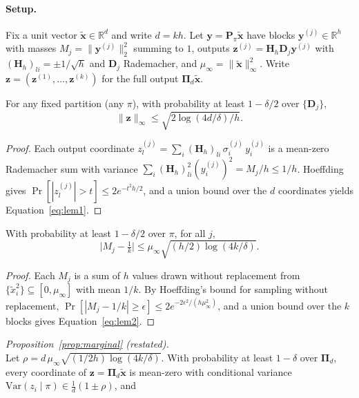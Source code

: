 \paragraph{Setup.}
Fix a unit vector $\tilde{\mathbf{x}} \in \mathbb{R}^d$ and write $d = kh$. Let $\mathbf{y} = \mathbf{P}_\pi \tilde{\mathbf{x}}$ have blocks $\mathbf{y}^{(j)} \in \mathbb{R}^h$ with masses $M_j = \|\mathbf{y}^{(j)}\|_2^2$ summing to $1$, outputs $\mathbf{z}^{(j)} = \mathbf{H}_h \mathbf{D}_j \mathbf{y}^{(j)}$ with $(\mathbf{H}_h)_{li} = \pm 1/\sqrt{h}$ and $\mathbf{D}_j$ Rademacher, and $\mu_\infty = \|\tilde{\mathbf{x}}\|_\infty^2$. Write $\mathbf{z} = (\mathbf{z}^{(1)}, \dots, \mathbf{z}^{(k)})$ for the full output $\boldsymbol{\Pi}_d \tilde{\mathbf{x}}$.
\begin{lemma}
\label{lem:block-incoherence}
For any fixed partition (any $\pi$), with probability at least $1 - \delta/2$ over $\{\mathbf{D}_j\}$,
\begin{equation}
\|\mathbf{z}\|_\infty \le \sqrt{2 \log(4d/\delta)/h}.
\label{eq:lem1}
\end{equation}
\end{lemma}
\begin{proof}
Each output coordinate $z^{(j)}_l = \sum_i (\mathbf{H}_h)_{li}\, \sigma^{(j)}_i\, y^{(j)}_i$ is a mean-zero Rademacher sum with variance $\sum_i (\mathbf{H}_h)_{li}^2 (y^{(j)}_i)^2 = M_j/h \le 1/h$. Hoeffding gives $\Pr[|z^{(j)}_l| > t] \le 2 e^{-t^2 h/2}$, and a union bound over the $d$ coordinates yields Equation~\eqref{eq:lem1}.
\end{proof}
\begin{lemma}
\label{lem:balancing}
With probability at least $1 - \delta/2$ over $\pi$, for all $j$,
\begin{equation}
\big| M_j - \tfrac{1}{k} \big| \le \mu_\infty \sqrt{(h/2)\log(4k/\delta)}.
\label{eq:lem2}
\end{equation}
\end{lemma}
\begin{proof}
Each $M_j$ is a sum of $h$ values drawn without replacement from $\{\tilde{x}_i^2\} \subseteq [0, \mu_\infty]$ with mean $1/k$. By Hoeffding's bound for sampling without replacement, $\Pr[|M_j - 1/k| \ge \epsilon] \le 2 e^{-2\epsilon^2 / (h\mu_\infty^2)}$, and a union bound over the $k$ blocks gives Equation~\eqref{eq:lem2}.
\end{proof}
\medskip
\noindent\textit{Proposition~\ref{prop:marginal} (restated).}\\
Let $\rho = d\,\mu_\infty \sqrt{(1/2h)\log(4k/\delta)}$. With probability at least $1-\delta$ over $\boldsymbol{\Pi}_d$, every coordinate of $\mathbf{z} = \boldsymbol{\Pi}_d\tilde{\mathbf{x}}$ is mean-zero with conditional variance $\mathrm{Var}(z_i \mid \pi) \in \frac{1}{d}(1 \pm \rho)$, and
